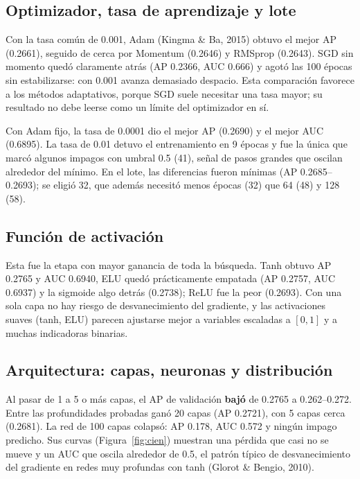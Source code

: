 \documentclass[12pt,a4paper]{article}
\begin{document}
\subsection{Optimizador, tasa de aprendizaje y lote}

Con la tasa común de 0.001, Adam (Kingma \& Ba, 2015) obtuvo el mejor AP (0.2661), seguido de cerca por Momentum (0.2646) y RMSprop (0.2643). SGD sin momento quedó claramente atrás (AP 0.2366, AUC 0.666) y agotó las 100 épocas sin estabilizarse: con 0.001 avanza demasiado despacio. Esta comparación favorece a los métodos adaptativos, porque SGD suele necesitar una tasa mayor; su resultado no debe leerse como un límite del optimizador en sí.

Con Adam fijo, la tasa de 0.0001 dio el mejor AP (0.2690) y el mejor AUC (0.6895). La tasa de 0.01 detuvo el entrenamiento en 9 épocas y fue la única que marcó algunos impagos con umbral 0.5 (41), señal de pasos grandes que oscilan alrededor del mínimo. En el lote, las diferencias fueron mínimas (AP 0.2685--0.2693); se eligió 32, que además necesitó menos épocas (32) que 64 (48) y 128 (58).

\subsection{Función de activación}

Esta fue la etapa con mayor ganancia de toda la búsqueda. Tanh obtuvo AP 0.2765 y AUC 0.6940, ELU quedó prácticamente empatada (AP 0.2757, AUC 0.6937) y la sigmoide algo detrás (0.2738); ReLU fue la peor (0.2693). Con una sola capa no hay riesgo de desvanecimiento del gradiente, y las activaciones suaves (tanh, ELU) parecen ajustarse mejor a variables escaladas a $[0,1]$ y a muchas indicadoras binarias.

\subsection{Arquitectura: capas, neuronas y distribución}

Al pasar de 1 a 5 o más capas, el AP de validación \textbf{bajó} de 0.2765 a 0.262--0.272. Entre las profundidades probadas ganó 20 capas (AP 0.2721), con 5 capas cerca (0.2681). La red de 100 capas colapsó: AP 0.178, AUC 0.572 y ningún impago predicho. Sus curvas (Figura~\ref{fig:cien}) muestran una pérdida que casi no se mueve y un AUC que oscila alrededor de 0.5, el patrón típico de desvanecimiento del gradiente en redes muy profundas con tanh (Glorot \& Bengio, 2010).
\end{document}
